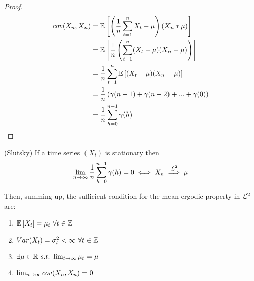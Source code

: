 \begin{proof}
    \begin{equation*}
        \begin{split}
            cov(\bar{X}_n,X_n)&=\mathbb{E}\left[\left(\frac{1}{n}\sum_{t=1}^nX_t-\mu\right)(X_n*\mu)\right]\\
            &=\mathbb{E}\left[\frac{1}{n}\left(\sum_{t=1}^n(X_t-\mu)(X_n-\mu)\right)\right]\\
            &=\frac{1}{n}\sum_{t=1}^n\mathbb{E}\left[(X_t-\mu)(X_n-\mu)\right]\\
            &=\frac{1}{n}\left(\gamma(n-1)+\gamma(n-2)+...+\gamma(0)\right)\\
            &=\frac{1}{n}\sum_{h=0}^{n-1}\gamma(h)\\
        \end{split}
    \end{equation*} 
\end{proof}

\begin{theorem}
    (Slutsky) If a time series $(X_t)$ is stationary then
    \[
        \lim_{n\to\infty}\frac{1}{n}\sum_{h=0}^{n-1}\gamma(h)=0\iff\bar{X}_n\stackrel{\mathcal{L}^{2}}{\implies}\mu
    \]
\end{theorem}

Then, summing up, the sufficient condition for the mean-ergodic property in $\mathcal{L}^{2}$ are:
\begin{enumerate}
    \item $\mathbb{E}\left[X_t\right]=\mu_t\ \forall t\in\mathbb{Z}$
    \item $Var(X_t)=\sigma^2_t<\infty\ \forall t\in\mathbb{Z}$
    \item $\exists\mu\in\R\ s.t.\ \lim_{t\to\infty}\mu_t=\mu$
    \item $\lim_{n\to\infty}cov(\bar{X}_n, X_n)=0$
\end{enumerate}

